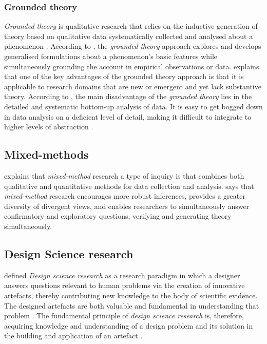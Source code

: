 \subsubsection{Grounded theory}
\label{subsub:groundedtheory}
\textit{Grounded theory} is qualitative research that relies on the inductive generation of theory based on qualitative data systematically collected and analysed about a phenomenon \parencite[p.98--99]{Recker2012}. According to \textcite[p.~99]{Recker2012}, the \textit{grounded theory} approach explores and develops generalised formulations about a phenomenon's basic features while simultaneously grounding the account in empirical observations or data. \textcite[p.~99]{Recker2012} explains that one of the key advantages of the grounded theory approach is that it is applicable to research domains that are new or emergent and yet lack substantive theory. According to \textcite[p.~100]{Recker2012}, the main disadvantage of the \textit{grounded theory} lies in the detailed and systematic bottom-up analysis of data. It is easy to get bogged down in data analysis on a deficient level of detail, making it difficult to integrate to higher levels of abstraction \parencite[p.~100]{Recker2012}.

\subsection{Mixed-methods}
\label{sub:mixedmethods}
\textcite[p.~100--101]{Recker2012}  explains that \textit{mixed-method} research a type of inquiry is that combines both qualitative and quantitative methods for data collection and analysis. \textcite[p.~101]{Recker2012}  says that \textit{mixed-method} research encourages more robust inferences, provides a greater diversity of divergent views, and enables researchers to simultaneously answer confirmatory and exploratory questions, verifying and generating theory simultaneously.

\subsection{Design Science research}
\label{sub:designscienceresearch}
\textcite[p.~5]{Hevner2004} defined \textit{Design science research} as a research paradigm in which a designer answers questions relevant to human problems via the creation of innovative artefacts, thereby contributing new knowledge to the body of scientific evidence. The designed artefacts are both valuable and fundamental in understanding that problem \parencite[p.~5]{Hevner2004}. The fundamental principle of \textit{design science research} is, therefore, acquiring knowledge and understanding of a design problem and its solution in the building and application of an artefact \parencite[p.~103]{Recker2012}.


